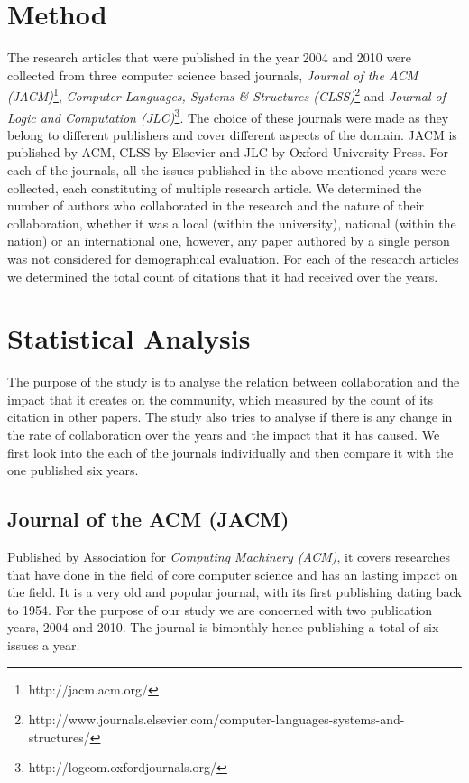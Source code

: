 \documentclass[12pt]{article}
\begin{document}
\section{Method}
The research articles that were published in the year 2004 and 2010 were collected from three computer science based journals, \textit{Journal of the ACM (JACM)}\footnote{http://jacm.acm.org/}, \textit{Computer Languages, Systems \& Structures (CLSS)}\footnote{http://www.journals.elsevier.com/computer-languages-systems-and-structures/} and \textit{Journal of Logic and Computation (JLC)}\footnote{http://logcom.oxfordjournals.org/}. The choice of these journals were made as they belong to different publishers and cover different aspects of the domain. JACM is published by ACM, CLSS by Elsevier and JLC by Oxford University Press. For each of the journals, all the issues published in the above mentioned years were collected, each constituting of multiple research article. We determined the number of authors who collaborated in the research and the nature of their collaboration, whether it was a local (within the university), national (within the nation) or an international one, however, any paper authored by a single person was not considered for demographical evaluation. For each of the research articles we determined the total count of citations that it had received over the years.

\section{Statistical Analysis}
The purpose of the study is to analyse the relation between collaboration and the impact that it creates on the community, which measured by the count of its citation in other papers. The study also tries to analyse if there is any change in the rate of collaboration over the years and the impact that it has caused. We first look into the each of the journals individually and then compare it with the one published six years.

\subsection{Journal of the ACM (JACM)}
Published by Association for \textit{Computing Machinery (ACM)}, it covers researches that have done in the field of core computer science and has an lasting impact on the field. It is a very old and popular journal, with its first publishing dating back to 1954. For the purpose of our study we are concerned with two publication years, 2004 and 2010. The journal is bimonthly hence publishing a total of six issues a year. 
\end{document}
